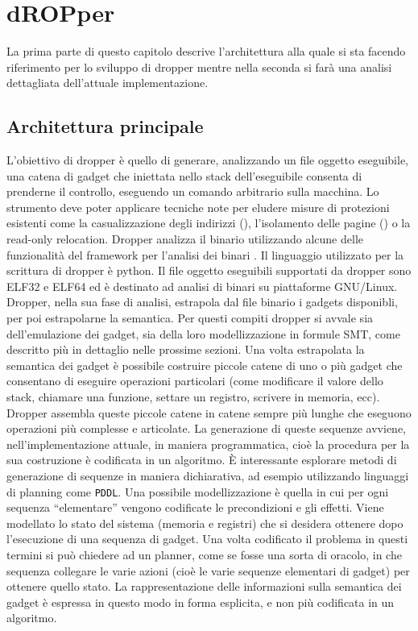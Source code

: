 \chapter{dROPper}

La prima parte di questo capitolo descrive l'architettura alla quale
si sta facendo riferimento per lo sviluppo di dropper mentre nella
seconda si farà una analisi dettagliata dell'attuale implementazione.

\section{Architettura principale}

L'obiettivo di dropper è quello di generare, analizzando un file
oggetto eseguibile, una catena di gadget che iniettata nello stack
dell'eseguibile consenta di prenderne il controllo, eseguendo un
comando arbitrario sulla macchina. Lo strumento deve poter applicare
tecniche note per eludere misure di protezioni esistenti come la
casualizzazione degli indirizzi (), l'isolamento delle
pagine () o la read-only relocation. Dropper analizza il
binario utilizzando alcune delle funzionalità del framework per
l'analisi dei binari . Il linguaggio utilizzato per la
scrittura di dropper è python. Il file oggetto eseguibili supportati
da dropper sono ELF32 e ELF64 ed è destinato ad analisi di binari su
piattaforme GNU/Linux. Dropper, nella sua fase di analisi, estrapola
dal file binario i gadgets disponibli, per poi estrapolarne la
semantica. Per questi compiti dropper si avvale sia dell'emulazione
dei gadget, sia della loro modellizzazione in formule SMT, come
descritto più in dettaglio nelle prossime sezioni. Una volta
estrapolata la semantica dei gadget è possibile costruire piccole
catene di uno o più gadget che consentano di eseguire operazioni
particolari (come modificare il valore dello stack, chiamare una
funzione, settare un registro, scrivere in memoria, ecc). Dropper
assembla queste piccole catene in catene sempre più lunghe che
eseguono operazioni più complesse e articolate. La generazione di
queste sequenze avviene, nell'implementazione attuale, in maniera
programmatica, cioè la procedura per la sua costruzione è codificata
in un algoritmo. È interessante esplorare metodi di generazione di
sequenze in maniera dichiarativa, ad esempio utilizzando linguaggi di
planning come \lstinline{PDDL}\cite{pddl-97}. Una possibile modellizzazione è
quella in cui per ogni sequenza ``elementare'' vengono codificate le
precondizioni e gli effetti. Viene modellato lo stato del sistema
(memoria e registri) che si desidera ottenere dopo l'esecuzione di una
sequenza di gadget. Una volta codificato il problema in questi termini
si può chiedere ad un planner, come se fosse una sorta di oracolo, in
che sequenza collegare le varie azioni (cioè le varie sequenze
elementari di gadget) per ottenere quello stato. La rappresentazione
delle informazioni sulla semantica dei gadget è espressa in questo
modo in forma esplicita, e non più codificata in un algoritmo.

